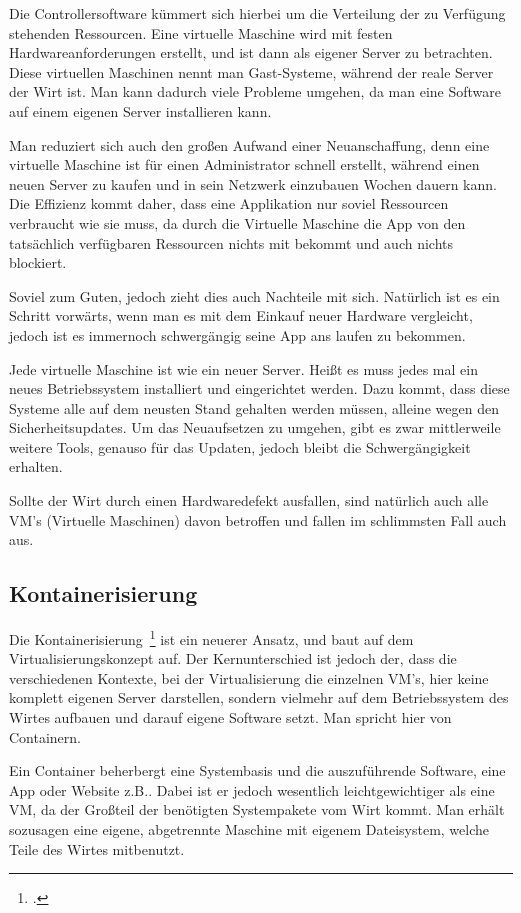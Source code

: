 Die Controllersoftware kümmert sich hierbei um die Verteilung der zu Verfügung stehenden Ressourcen. Eine virtuelle Maschine wird mit festen Hardwareanforderungen
erstellt, und ist dann als eigener Server zu betrachten.
Diese virtuellen Maschinen nennt man Gast-Systeme, während der reale Server der Wirt ist. Man kann dadurch viele Probleme umgehen, da man eine Software auf einem eigenen Server installieren kann.

Man reduziert sich auch den großen Aufwand einer Neuanschaffung, denn eine virtuelle Maschine ist für einen Administrator schnell erstellt, während einen neuen Server zu kaufen und in sein Netzwerk einzubauen Wochen dauern kann.
Die Effizienz kommt daher, dass eine Applikation nur soviel Ressourcen verbraucht wie sie muss, da durch die Virtuelle Maschine die App von den tatsächlich verfügbaren Ressourcen nichts mit bekommt und auch nichts blockiert.

Soviel zum Guten, jedoch zieht dies auch Nachteile mit sich.
Natürlich ist es ein Schritt vorwärts, wenn man es mit dem Einkauf neuer Hardware vergleicht, jedoch ist es immernoch schwergängig seine App ans laufen zu bekommen.

Jede virtuelle Maschine ist wie ein neuer Server. Heißt es muss jedes mal ein neues Betriebssystem installiert und eingerichtet werden. Dazu kommt, dass diese Systeme alle auf dem neusten Stand gehalten werden müssen,
alleine wegen den Sicherheitsupdates. Um das Neuaufsetzen zu umgehen, gibt es zwar mittlerweile weitere Tools, genauso für das Updaten, jedoch bleibt die Schwergängigkeit erhalten.

Sollte der Wirt durch einen Hardwaredefekt ausfallen, sind natürlich auch alle VM's (Virtuelle Maschinen) davon betroffen und fallen im schlimmsten Fall auch aus.

\subsection{Kontainerisierung}
Die Kontainerisierung~\footcite[Vgl. ][]{website:container} ist ein neuerer Ansatz, und baut auf dem Virtualisierungskonzept auf. Der Kernunterschied ist jedoch der, dass die verschiedenen Kontexte, bei der Virtualisierung die einzelnen VM's,
hier keine komplett eigenen Server darstellen, sondern vielmehr auf dem Betriebssystem des Wirtes aufbauen und darauf eigene Software setzt. Man spricht hier von Containern.

Ein Container beherbergt eine Systembasis und die auszuführende Software, eine App oder Website z.B.. Dabei ist er jedoch wesentlich leichtgewichtiger als eine VM, 
da der Großteil der benötigten Systempakete vom Wirt kommt. Man erhält sozusagen eine eigene, abgetrennte Maschine mit eigenem Dateisystem, welche Teile des Wirtes mitbenutzt.

